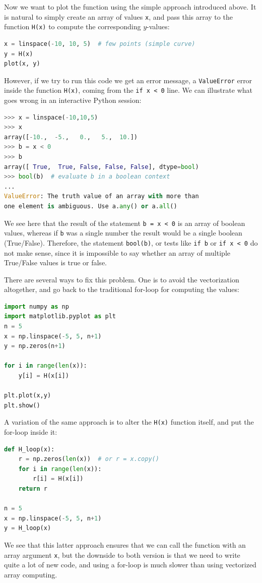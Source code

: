 \documentclass[graybox,envcountchap,sectrefs,final]{svmonodo}
\begin{document}
Now we want to plot the function using the simple approach introduced above. It is natural to simply create an
array of values \texttt{x}, and pass this array to the function \texttt{H(x)} to compute the corresponding $y$-values:
\begin{lstlisting}[language=Python,style=blue1]
x = linspace(-10, 10, 5)  # few points (simple curve)
y = H(x)
plot(x, y)
\end{lstlisting}
However, if we try to run this code we get an error message, a \texttt{ValueError} error inside the function
\texttt{H(x)}, coming from the \texttt{if x < 0} line. We can illustrate what goes wrong in an interactive Python session:
\begin{lstlisting}[language=Python,style=blue1]
>>> x = linspace(-10,10,5)
>>> x
array([-10.,  -5.,   0.,   5.,  10.])
>>> b = x < 0
>>> b
array([ True,  True, False, False, False], dtype=bool)
>>> bool(b)  # evaluate b in a boolean context
...
ValueError: The truth value of an array with more than
one element is ambiguous. Use a.any() or a.all()
\end{lstlisting}
We see here that the result of the statement \texttt{b = x < 0} is an array of boolean values, whereas if \texttt{b} was a
single number the result would be a single boolean (True/False). Therefore, the statement \texttt{bool(b)}, or
tests like \texttt{if b} or \texttt{if x < 0} do not make sense, since it is impossible to say whether an array of multiple
True/False values is true or false.

There are several ways to fix this problem. One is to avoid the vectorization altogether, and go back to
the traditional for-loop for computing the values:
\begin{lstlisting}[language=Python,style=blue1]
import numpy as np
import matplotlib.pyplot as plt
n = 5
x = np.linspace(-5, 5, n+1)
y = np.zeros(n+1)

for i in range(len(x)):
    y[i] = H(x[i])

plt.plot(x,y)
plt.show()
\end{lstlisting}
A variation of the same approach is to alter the \texttt{H(x)} function itself, and put the for-loop inside it:
\begin{lstlisting}[language=Python,style=blue1]
def H_loop(x):
    r = np.zeros(len(x))  # or r = x.copy()
    for i in range(len(x)):
        r[i] = H(x[i])
    return r

n = 5
x = np.linspace(-5, 5, n+1)
y = H_loop(x)
\end{lstlisting}
We see that this latter approach ensures that we can call the function with an array argument \texttt{x}, but the
downside to both version is that we need to write quite a lot of new code, and using  a
for-loop is much slower than using vectorized array computing.
\end{document}

